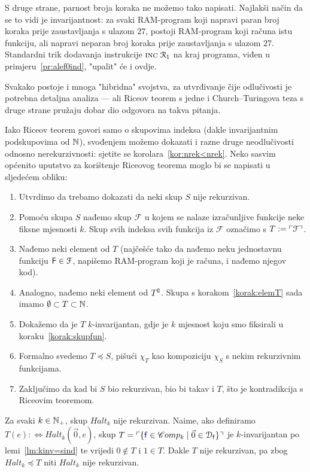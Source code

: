 S druge strane, parnost broja koraka ne možemo tako napisati. Najlakši način da se to vidi je invarijantnost: za svaki RAM-program koji napravi paran broj koraka prije zaustavljanja s ulazom $27$, postoji RAM-program koji računa istu funkciju, ali napravi neparan broj koraka prije zaustavljanja s ulazom $27$. Standardni trik dodavanja instrukcije $\textsc{inc}\;\mathcal R_{1}$ na kraj programa, viđen u primjeru~\ref{pr:alef0ind}, "upalit" će i ovdje.

Svakako postoje i mnoga "hibridna" svojstva, za utvrđivanje čije odlučivosti je potrebna detaljna analiza --- ali Riceov teorem s jedne i Church--\!Turingova teza s druge strane pružaju dobar dio odgovora na takva pitanja.

Iako Riceov teorem govori samo o skupovima indeksa (dakle invarijantnim podskupovima od ${\mathbb N}$), svođenjem možemo dokazati i razne druge neodlučivosti odnosno nerekurzivnosti: sjetite se korolara~\ref{kor:nrek<nrek}. Neko sasvim općenito uputstvo za korištenje Riceovog teorema moglo bi se napisati u sljedećem obliku:

\begin{enumerate}
    \item Utvrdimo da trebamo dokazati da neki skup $S$ nije rekurzivan.
    \item\label{korak:skupfun} Pomoću skupa $S$ nađemo skup $\mathcal F$ u kojem se nalaze izračunljive funkcije neke fiksne mjesnosti $k$.
    Skup svih indeksa svih funkcija iz $\mathcal F$ označimo s $T:=\ulcorner\mathcal F\urcorner$.
    \item\label{korak:elemT} Nađemo neki element od $T$ (najčešće tako da nađemo neku jednostavnu funkciju $\f F\in\mathcal F$, napišemo RAM-program koji je računa, i nađemo njegov kod).
    \item Analogno, nađemo neki element od $T\sp{{\scriptscriptstyle\complement}}$. Skupa s korakom~\ref{korak:elemT} sada imamo $\emptyset\subset T\subset{\mathbb N}$.
    \item Dokažemo da je $T$ $k$-invarijantan, gdje je $k$ mjesnost koju smo fiksirali u koraku~\ref{korak:skupfun}.
    \item Formalno svedemo $T\!\preceq S$, pišući $\chi_T$ kao kompoziciju $\chi_S$ s nekim rekurzivnim funkcijama.
    \item Zaključimo da kad bi $S$ bio rekurzivan, bio bi takav i $T$, što je kontradikcija s Riceovim teoremom.
\end{enumerate}

\begin{primjer}[{name=[neodlučivost $k$-mjesnog brojevnog problema zaustavljanja]}]
    Za svaki $k\in{\mathbb N}_+$, skup $Halt_k$ nije rekurzivan. Naime, ako definiramo $T(e):\Longleftrightarrow Halt_k(\vec 0,e)$, skup $T=\kins{\{\f f\in\mathscr Comp_k\mid\vec 0\in\dom{\f f}\}}$ je $k$-invarijantan po lemi~\ref{lm:kinv=sind} te vrijedi $0\notin T$ i $1\in T$. Dakle $T$ nije rekurzivan, pa zbog $Halt_k\preceq T$ niti $Halt_k$ nije rekurzivan.
\end{primjer}
